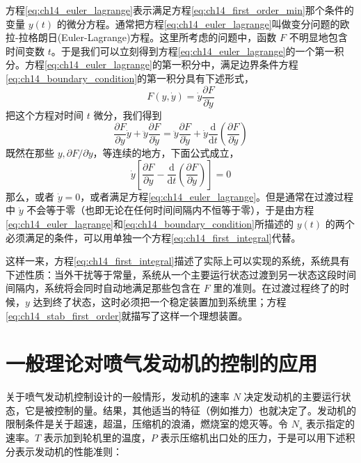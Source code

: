 方程\eqref{eq:ch14_euler_lagrange}表示满足方程\eqref{eq:ch14_first_order_min}那个条件的变量 $y(t)$ 的微分方程。通常把方程\eqref{eq:ch14_euler_lagrange}叫做变分问题的欧拉-拉格朗日(Euler-Lagrange)方程。这里所考虑的问题中，函数 $F$ 不明显地包含时间变数 $t$。于是我们可以立刻得到方程\eqref{eq:ch14_euler_lagrange}的一个第一积分。方程\eqref{eq:ch14_euler_lagrange}的第一积分中，满足边界条件方程\eqref{eq:ch14_boundary_condition}的第一积分具有下述形式，
\begin{equation}
F(y, \dot{y}) = \dot{y} \frac{\partial F}{\partial \dot{y}}
\label{eq:ch14_first_integral}
\end{equation}
把这个方程对时间 $t$ 微分，我们得到
\begin{equation*}
\frac{\partial F}{\partial y} \dot{y} + \ddot{y} \frac{\partial F}{\partial \dot{y}} = \ddot{y} \frac{\partial F}{\partial \dot{y}} + \dot{y} \frac{\mathrm{d}}{\mathrm{d}t} \left( \frac{\partial F}{\partial \dot{y}} \right)
\end{equation*}
既然在那些 $y, \partial F/\partial \dot{y}$，等连续的地方，下面公式成立，
\begin{equation*}
\dot{y} \left[ \frac{\partial F}{\partial y} - \frac{\mathrm{d}}{\mathrm{d}t} \left( \frac{\partial F}{\partial \dot{y}} \right) \right] = 0
\end{equation*}
那么，或者 $\dot{y}=0$，或者满足方程\eqref{eq:ch14_euler_lagrange}。但是通常在过渡过程中 $\dot{y}$ 不会等于零（也即无论在任何时间间隔内不恒等于零），于是由方程\eqref{eq:ch14_euler_lagrange}和\eqref{eq:ch14_boundary_condition}所描述的 $y(t)$ 的两个必须满足的条件，可以用单独一个方程\eqref{eq:ch14_first_integral}代替。

这样一来，方程\eqref{eq:ch14_first_integral}描述了实际上可以实现的系统，系统具有下述性质：当外干扰等于常量，系统从一个主要运行状态过渡到另一状态这段时间间隔内，系统将会同时自动地满足那些包含在 $F$ 里的准则。在过渡过程终了的时候，$y$ 达到终了状态，这时必须把一个稳定装置加到系统里；方程\eqref{eq:ch14_stab_first_order}就描写了这样一个理想装置。

\section{一般理论对喷气发动机的控制的应用}

关于喷气发动机控制设计的一般情形，发动机的速率 $N$ 决定发动机的主要运行状态，它是被控制的量。结果，其他适当的特征（例如推力）也就决定了。发动机的限制条件是关于超速，超温，压缩机的浪涌，燃烧室的熄灭等。令 $N_s$ 表示指定的速率。$T$ 表示加到轮机里的温度，$P$ 表示压缩机出口处的压力，于是可以用下述积分表示发动机的性能准则：

